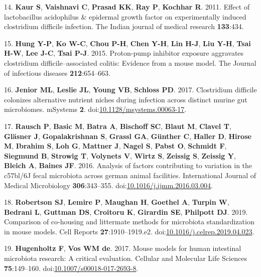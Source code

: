\documentclass[11pt,]{article}
\begin{document}
\hypertarget{ref-kaur2011effect}{}
14. \textbf{Kaur S}, \textbf{Vaishnavi C}, \textbf{Prasad KK},
\textbf{Ray P}, \textbf{Kochhar R}. 2011. Effect of lactobacillus
acidophilus \& epidermal growth factor on experimentally induced
clostridium difficile infection. The Indian journal of medical research
\textbf{133}:434.

\hypertarget{ref-hung2015proton}{}
15. \textbf{Hung Y-P}, \textbf{Ko W-C}, \textbf{Chou P-H}, \textbf{Chen
Y-H}, \textbf{Lin H-J}, \textbf{Liu Y-H}, \textbf{Tsai H-W}, \textbf{Lee
J-C}, \textbf{Tsai P-J}. 2015. Proton-pump inhibitor exposure aggravates
clostridium difficile--associated colitis: Evidence from a mouse model.
The Journal of infectious diseases \textbf{212}:654--663.

\hypertarget{ref-Jenior2017}{}
16. \textbf{Jenior ML}, \textbf{Leslie JL}, \textbf{Young VB},
\textbf{Schloss PD}. 2017. Clostridium difficile colonizes alternative
nutrient niches during infection across distinct murine gut microbiomes.
mSystems \textbf{2}.
doi:\href{https://doi.org/10.1128/msystems.00063-17}{10.1128/msystems.00063-17}.

\hypertarget{ref-Rausch2016}{}
17. \textbf{Rausch P}, \textbf{Basic M}, \textbf{Batra A},
\textbf{Bischoff SC}, \textbf{Blaut M}, \textbf{Clavel T},
\textbf{Gläsner J}, \textbf{Gopalakrishnan S}, \textbf{Grassl GA},
\textbf{Günther C}, \textbf{Haller D}, \textbf{Hirose M},
\textbf{Ibrahim S}, \textbf{Loh G}, \textbf{Mattner J}, \textbf{Nagel
S}, \textbf{Pabst O}, \textbf{Schmidt F}, \textbf{Siegmund B},
\textbf{Strowig T}, \textbf{Volynets V}, \textbf{Wirtz S},
\textbf{Zeissig S}, \textbf{Zeissig Y}, \textbf{Bleich A},
\textbf{Baines JF}. 2016. Analysis of factors contributing to variation
in the c57bl/6J fecal microbiota across german animal facilities.
International Journal of Medical Microbiology \textbf{306}:343--355.
doi:\href{https://doi.org/10.1016/j.ijmm.2016.03.004}{10.1016/j.ijmm.2016.03.004}.

\hypertarget{ref-Robertson2019}{}
18. \textbf{Robertson SJ}, \textbf{Lemire P}, \textbf{Maughan H},
\textbf{Goethel A}, \textbf{Turpin W}, \textbf{Bedrani L},
\textbf{Guttman DS}, \textbf{Croitoru K}, \textbf{Girardin SE},
\textbf{Philpott DJ}. 2019. Comparison of co-housing and littermate
methods for microbiota standardization in mouse models. Cell Reports
\textbf{27}:1910--1919.e2.
doi:\href{https://doi.org/10.1016/j.celrep.2019.04.023}{10.1016/j.celrep.2019.04.023}.

\hypertarget{ref-Hugenholtz2017}{}
19. \textbf{Hugenholtz F}, \textbf{Vos WM de}. 2017. Mouse models for
human intestinal microbiota research: A critical evaluation. Cellular
and Molecular Life Sciences \textbf{75}:149--160.
doi:\href{https://doi.org/10.1007/s00018-017-2693-8}{10.1007/s00018-017-2693-8}.
\end{document}
